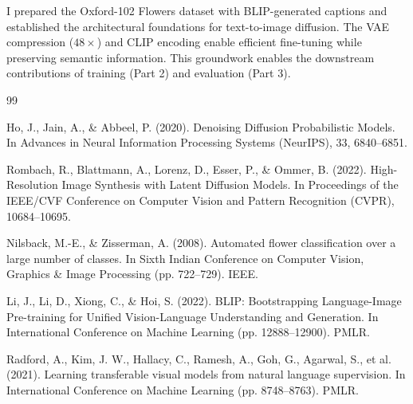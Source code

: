 \documentclass[11pt]{article}
\begin{document}
I prepared the Oxford-102 Flowers dataset with BLIP-generated captions and established the architectural foundations for text-to-image diffusion. The VAE compression ($48\times$) and CLIP encoding enable efficient fine-tuning while preserving semantic information. This groundwork enables the downstream contributions of training (Part 2) and evaluation (Part 3).

\begin{thebibliography}{99}

 Ho, J., Jain, A., \& Abbeel, P. (2020). Denoising Diffusion Probabilistic Models. In Advances in Neural Information Processing Systems (NeurIPS), 33, 6840--6851.

 Rombach, R., Blattmann, A., Lorenz, D., Esser, P., \& Ommer, B. (2022). High-Resolution Image Synthesis with Latent Diffusion Models. In Proceedings of the IEEE/CVF Conference on Computer Vision and Pattern Recognition (CVPR), 10684--10695.

 Nilsback, M.-E., \& Zisserman, A. (2008). Automated flower classification over a large number of classes. In Sixth Indian Conference on Computer Vision, Graphics \& Image Processing (pp. 722--729). IEEE.

 Li, J., Li, D., Xiong, C., \& Hoi, S. (2022). BLIP: Bootstrapping Language-Image Pre-training for Unified Vision-Language Understanding and Generation. In International Conference on Machine Learning (pp. 12888--12900). PMLR.

 Radford, A., Kim, J. W., Hallacy, C., Ramesh, A., Goh, G., Agarwal, S., et al. (2021). Learning transferable visual models from natural language supervision. In International Conference on Machine Learning (pp. 8748--8763). PMLR.

\end{thebibliography}
\end{document}
